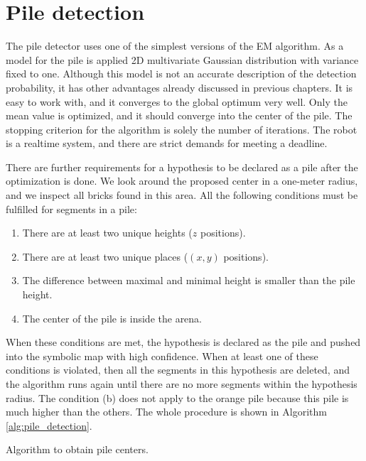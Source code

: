\section{Pile detection}
\label{sec:pile_detector}
The pile detector uses one of the simplest versions of the EM algorithm. As a model for the pile is applied 2D multivariate Gaussian distribution with variance fixed to one. Although this model is not an accurate description of the detection probability, it has other advantages already discussed in previous chapters. It is easy to work with, and it converges to the global optimum very well. Only the mean value is optimized, and it should converge into the center of the pile. The stopping criterion for the algorithm is solely the number of iterations. The robot is a realtime system, and there are strict demands for meeting a deadline. 

There are further requirements for a hypothesis to be declared as a pile after the optimization is done. We look around the proposed center in a one-meter radius, and we inspect all bricks found in this area. All the following conditions must be fulfilled for segments in a pile:
\begin{enumerate}[label=(\alph*)]
\item There are at least two unique heights ($z$ positions).
\item There are at least two unique places ($(x,y)$ positions).
\item The difference between maximal and minimal height is smaller than the pile height.
\item The center of the pile is inside the arena.
\end{enumerate}
When these conditions are met, the hypothesis is declared as the pile and pushed into the symbolic map with high confidence. When at least one of these conditions is violated, then all the segments in this hypothesis are deleted, and the algorithm runs again until there are no more segments within the hypothesis radius. The condition (b) does not apply to the orange pile because this pile is much higher than the others. The whole procedure is shown in Algorithm \ref{alg:pile_detection}.
\begin{algorithm}[]
 \caption{Algorithm to obtain pile centers.}
 \label{alg:pile_detection}
\end{algorithm}

